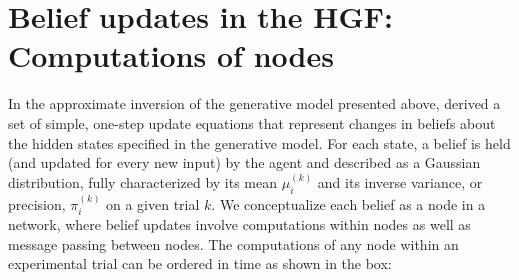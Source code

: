 \section{Belief updates in the HGF: Computations of nodes}
In the approximate inversion of the generative model presented above, \cite{Mathys2011} derived a set of simple, one-step update equations that represent changes in beliefs about the hidden states specified in the generative model. For each state, a belief is held (and updated for every new input) by the agent and described as a Gaussian distribution, fully characterized by its mean $\mu_i^{(k)}$ and its inverse variance, or precision, $\pi_i^{(k)}$ on a given trial $k$. We conceptualize each belief as a node in a network, where belief updates involve computations within nodes as well as message passing between nodes. The computations of any node within an experimental trial can be ordered in time as shown in the box:
\vspace{1cm}


